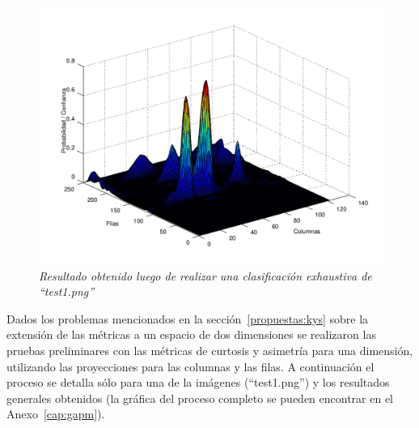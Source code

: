 \begin{figure}[H]
  \centering
  \includegraphics[scale=.6]{images/resultado_ejemplo}
  \caption{\em Resultado obtenido luego de realizar una clasificación exhaustiva de ``test1.png''}  
  \label{fig:ejemploresultado}
\end{figure}

Dados los problemas mencionados en la sección~\ref{propuestas:kys} sobre la extensión de las métricas a un espacio de dos dimensiones se realizaron las pruebas preliminares con las métricas de curtosis y asimetría para una dimensión, utilizando las proyecciones para las columnas y las filas. A continuación el proceso se detalla sólo para una de la imágenes (``test1.png'') y los resultados generales obtenidos (la gráfica del proceso completo se pueden encontrar en el Anexo~\ref{cap:gapm}).

